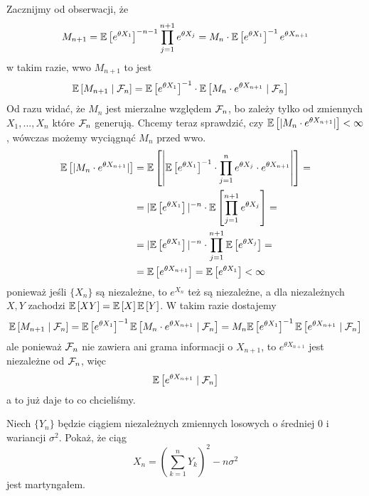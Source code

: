 \begin{solution}
  Zacznijmy od obserwacji, że
  $$M_{n+1}=\expected{e^{\theta X_1}}^{-n-1}\prod_{j=1}^{n+1}e^{\theta X_j}=M_n\cdot\expected{e^{\theta X_1}}^{-1}e^{\theta X_{n+1}}$$
  w takim razie, wwo $M_{n+1}$ to jest
  \begin{align*}
    \expected{M_{n+1}}{\set{F}_n}&=\expected{e^{\theta X_1}}^{-1}\cdot \expected{M_n\cdot e^{\theta X_{n+1}}}{\set{F}_n}
  \end{align*}
  Od razu widać, że $M_n$ jest mierzalne względem $\mathcal{F}_n$, bo zależy tylko od zmiennych $X_1,...,X_n$ które $\mathcal{F}_n$ generują. Chcemy teraz sprawdzić, czy $\expected{|M_n\cdot e^{\theta X_{n+1}}|}<\infty$, wówczas możemy wyciągnąć $M_n$ przed wwo.
  \begin{align*}
    \expected{|M_n\cdot e^{\theta X_{n+1}}|}&=\expected{\left |\expected{e^{\theta X_1}}^{-1}\cdot \prod_{j=1}^{n} e^{\theta X_j}\cdot e^{\theta X_{n+1}} \right| }=\\ 
                                            &=|\expected{e^{\theta X_1}}|^{-n}\cdot\expected{ \prod_{j=1}^{n+1}e^{\theta X_j} }=\\ 
                                            &=|\expected{e^{\theta X_1}}|^{-n}\cdot \prod_{j=1}^{n+1}\expected{e^{\theta X_j}}=\\ 
                                            &=\expected{e^{\theta X_{n+1}}}=\expected{e^{\theta X_1}}<\infty
  \end{align*}
  ponieważ jeśli $\{X_n\}$ są niezależne, to $e^{X_n}$ też są niezależne, a dla niezależnych $X,Y$ zachodzi $\expected{XY}=\expected{X}\expected{Y}$.
  W takim razie dostajemy
  $$\expected{M_{n+1}}{\set{F}_n}=\expected{e^{\theta X_1}}^{-1}\expected{M_n\cdot e^{\theta X_{n+1}}}{\set{F}_n}=M_n\expected{e^{\theta X_1}}^{-1}\expected{e^{\theta X_{n+1}}}{\set{F}_{n}}$$
  ale ponieważ $\mathcal{F}_n$ nie zawiera ani grama informacji o $X_{n+1}$, to $e^{\theta X_{n+1}}$ jest niezależne od $\mathcal{F}_n$, więc
  $$\expected{e^{\theta X_{n+1}}}{\set{F}_n}$$
    a to już daje to co chcieliśmy.
\end{solution}

\begin{problem}
  Niech $\{Y_n\}$ będzie ciągiem niezależnych zmiennych losowych o średniej $0$ i wariancji $\sigma^2$. Pokaż, że ciąg 
  $$X_n=\left(\sum_{k=1}^nY_k\right)^2-n\sigma^2$$
  jest martyngałem.
\end{problem}

